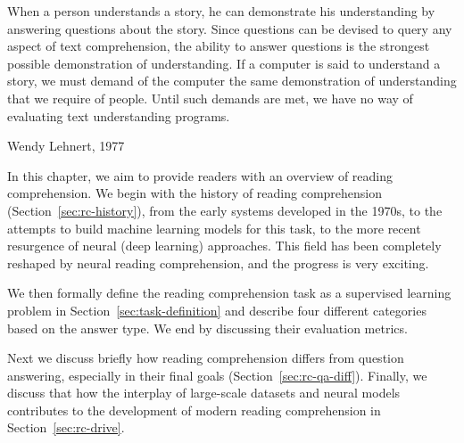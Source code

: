 
\epigraph{When a person understands a story, he can demonstrate his understanding by answering questions about the story. Since questions can be devised to query any aspect of text comprehension, the ability to answer questions is the strongest possible demonstration of understanding. If a computer is said to understand a story, we must demand of the computer the same demonstration of understanding that we require of people. Until such demands are met, we have no way of evaluating text understanding programs.}{Wendy Lehnert, 1977}


In this chapter, we aim to provide readers with an overview of reading comprehension. We begin with the history of reading comprehension (Section~\ref{sec:rc-history}), from the early systems developed in the 1970s, to the attempts to build machine learning models for this task, to the more recent resurgence of neural (deep learning) approaches. This field has been completely reshaped by neural reading comprehension, and the progress is very exciting.

We then formally define the reading comprehension task as a supervised learning problem in Section~\ref{sec:task-definition} and describe four different categories based on the answer type. We end by discussing their evaluation metrics.

Next we discuss briefly how reading comprehension differs from question answering, especially in their final goals (Section~\ref{sec:rc-qa-diff}). Finally, we discuss that how the interplay of large-scale datasets and neural models contributes to the development of modern reading comprehension in Section~\ref{sec:rc-drive}.

